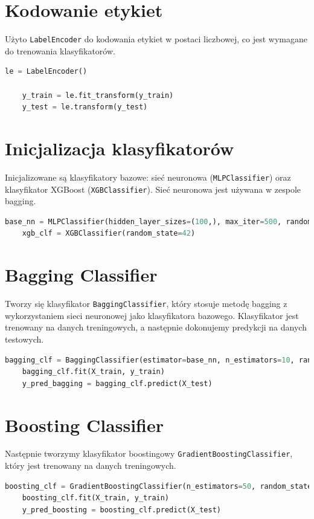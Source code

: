 \documentclass[polish,11pt,a4paper]{article}
\begin{document}
\section{Kodowanie etykiet}
Użyto \texttt{LabelEncoder} do kodowania etykiet w postaci liczbowej, co jest wymagane do trenowania klasyfikatorów.

\begin{lstlisting}[language=Python]
	le = LabelEncoder()
	
	y_train = le.fit_transform(y_train)
	y_test = le.transform(y_test)
\end{lstlisting}

\section{Inicjalizacja klasyfikatorów}
Inicjalizowane są klasyfikatory bazowe: sieć neuronowa (\texttt{MLPClassifier}) oraz klasyfikator XGBoost (\texttt{XGBClassifier}). Sieć neuronowa jest używana w zespole bagging.

\begin{lstlisting}[language=Python]
	base_nn = MLPClassifier(hidden_layer_sizes=(100,), max_iter=500, random_state=42)
	xgb_clf = XGBClassifier(random_state=42)
\end{lstlisting}

\section{Bagging Classifier}
Tworzy się klasyfikator \texttt{BaggingClassifier}, który stosuje metodę bagging z wykorzystaniem sieci neuronowej jako klasyfikatora bazowego. Klasyfikator jest trenowany na danych treningowych, a następnie dokonujemy predykcji na danych testowych.

\begin{lstlisting}[language=Python]
	bagging_clf = BaggingClassifier(estimator=base_nn, n_estimators=10, random_state=42)
	bagging_clf.fit(X_train, y_train)
	y_pred_bagging = bagging_clf.predict(X_test)
\end{lstlisting}

\section{Boosting Classifier}
Następnie tworzymy klasyfikator boostingowy \texttt{GradientBoostingClassifier}, który jest trenowany na danych treningowych.

\begin{lstlisting}[language=Python]
	boosting_clf = GradientBoostingClassifier(n_estimators=50, random_state=42)
	boosting_clf.fit(X_train, y_train)
	y_pred_boosting = boosting_clf.predict(X_test)
\end{lstlisting}
\end{document}
